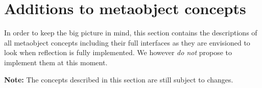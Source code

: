 \section{Additions to metaobject concepts}
\label{section-all-Concepts}

In order to keep the big picture in mind, this section
contains the descriptions of all metaobject concepts
including their full interfaces as they are envisioned
to look when reflection is fully implemented. We
however {\em do not} propose to implement them at this moment.

\textbf{Note:} The concepts described in this section are still subject to changes.






















